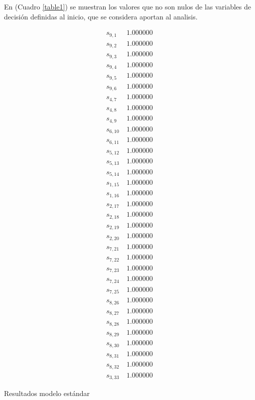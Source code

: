 \documentclass[journal, 10pt]{IEEEtran}
\begin{document}
En (Cuadro \ref{table1}) se muestran los valores que no son nulos de las variables de decisión definidas al inicio, que se considera aportan al analisis. 
\begin{table}
	\begin{align*}
		s_{9,1}&   \     1.000000\\        
		s_{9,2}&   \     1.000000\\          
		s_{9,3}&   \     1.000000\\            
		s_{9,4}&   \     1.000000\\           
		s_{9,5}&   \     1.000000\\           
		s_{9,6}&   \     1.000000\\          
		s_{4,7}&   \     1.000000\\        
		s_{4,8}&   \     1.000000\\         
		s_{4,9}&   \     1.000000\\            
	 s_{6,10}&     \   1.000000\\           
	 s_{6,11}&     \   1.000000\\            
	 s_{5,12}&     \   1.000000\\            
	 s_{5,13}&     \   1.000000\\         
	 s_{5,14}&     \   1.000000\\            
	 s_{1,15}&     \   1.000000\\           
	 s_{1,16}&     \   1.000000\\            
	 s_{2,17}&     \   1.000000\\         
	 s_{2,18}&     \   1.000000\\          
	 s_{2,19}&     \   1.000000\\            
	 s_{2,20}&     \   1.000000\\            
	 s_{7,21}&     \   1.000000\\           
	 s_{7,22}&     \   1.000000\\            
	 s_{7,23}&     \   1.000000\\            
	 s_{7,24}&     \   1.000000\\           
	 s_{7,25}&     \   1.000000\\            
	 s_{8,26}&     \   1.000000\\           
	 s_{8,27}&     \   1.000000\\            
	 s_{8,28}&     \   1.000000\\         
	 s_{8,29}&     \   1.000000\\         
	 s_{8,30}&     \   1.000000\\          
	 s_{8,31}&     \   1.000000\\        
	 s_{8,32}&     \   1.000000\\       
	 s_{3,33}&     \   1.000000 
	\end{align*}
\caption{Resultados modelo estándar}
\label{table1}
\end{table}
\end{document}
